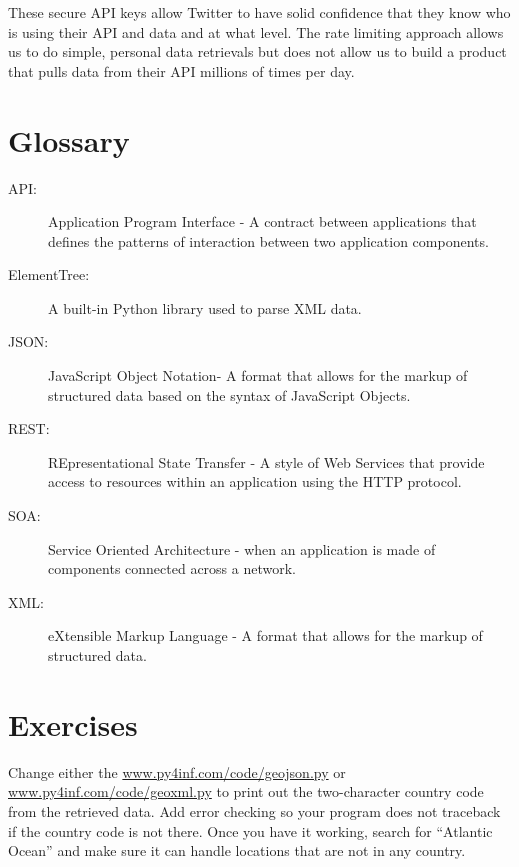 \documentclass[11pt]{book}
\begin{document}
These secure API keys allow Twitter to have solid confidence that they 
know who is using their API and data and at what level.   The rate
limiting approach allows us to do simple, personal data retrievals but
does not allow us to build a product that pulls data from their API 
millions of times per day.

\section{Glossary}

\begin{description}

\item[API:] Application Program Interface - A contract between
applications that defines the patterns of interaction between 
two application components.

\item[ElementTree:] A built-in Python library used to parse XML data.

\item[JSON:] JavaScript Object Notation- A format that allows for 
the markup of structured data based on the syntax of JavaScript
Objects.

\item[REST:] REpresentational State Transfer - A style of Web Services 
that provide access to resources within an application using the HTTP
protocol.

\item[SOA:] Service Oriented Architecture - when an application is 
made of components connected across a network.

\item[XML:] eXtensible Markup Language - A format that allows for 
the markup of structured data.

\end{description}

\section{Exercises}

\begin{ex}
Change either the 
\url{www.py4inf.com/code/geojson.py} or
\url{www.py4inf.com/code/geoxml.py} to print out the 
two-character country code from the retrieved data.
Add error checking so your program does not traceback
if the country code is not there.  Once you have it 
working, search for ``Atlantic Ocean'' and make sure
it can handle locations that are not in any country.
\end{ex}
\end{document}

